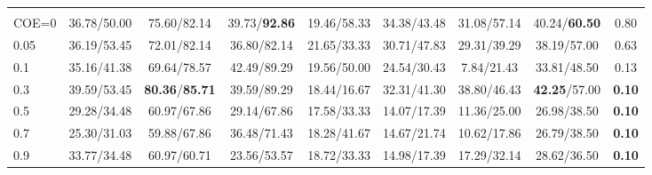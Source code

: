 \begin{table}[t]
\begin{tabular}{@{}lcccccccc@{}}
\rowcolor{gray!15}
\multicolumn{9}{@{}l@{}}{\textbf{\textbf{BudgetMem-\textsc{Cap}} (COE)}} \\
COE=0   & 36.78/50.00 & 75.60/82.14 & 39.73/\textbf{92.86} & 19.46/58.33 & 34.38/43.48 & 31.08/57.14 & 40.24/\textbf{60.50} & 0.80 \\
0.05    & 36.19/53.45 & 72.01/82.14 & 36.80/82.14 & 21.65/33.33 & 30.71/47.83 & 29.31/39.29 & 38.19/57.00 & 0.63 \\
0.1     & 35.16/41.38 & 69.64/78.57 & 42.49/89.29 & 19.56/50.00 & 24.54/30.43 & 7.84/21.43  & 33.81/48.50 & 0.13 \\
0.3     & 39.59/53.45 & \textbf{80.36}/\textbf{85.71} & 39.59/89.29 & 18.44/16.67 & 32.31/41.30 & 38.80/46.43 & \textbf{42.25}/57.00 & \textbf{0.10} \\
0.5     & 29.28/34.48 & 60.97/67.86 & 29.14/67.86 & 17.58/33.33 & 14.07/17.39 & 11.36/25.00 & 26.98/38.50 & \textbf{0.10} \\
0.7     & 25.30/31.03 & 59.88/67.86 & 36.48/71.43 & 18.28/41.67 & 14.67/21.74 & 10.62/17.86 & 26.79/38.50 & \textbf{0.10} \\
0.9     & 33.77/34.48 & 60.97/60.71 & 23.56/53.57 & 18.72/33.33 & 14.98/17.39 & 17.29/32.14 & 28.62/36.50 & \textbf{0.10} \\
\bottomrule
\end{tabular}
\end{table}